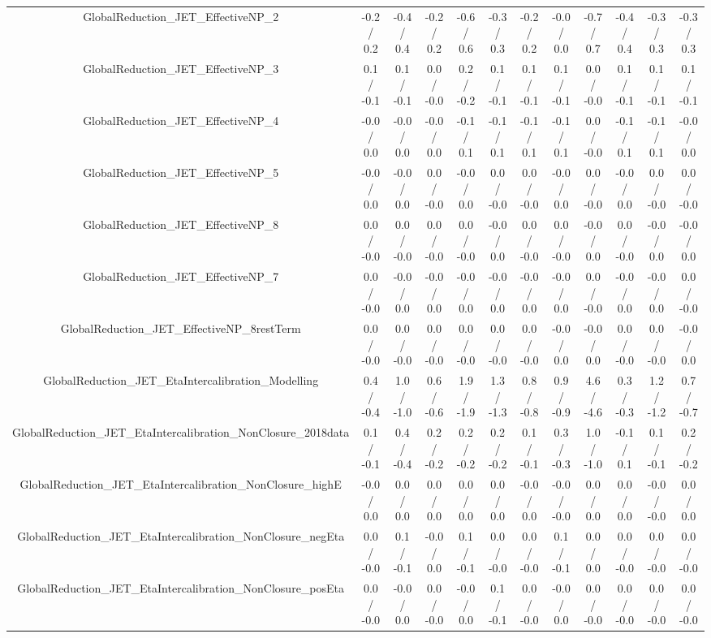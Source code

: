 \begin{table}[htbp]
\begin{center}
\begin{tabular}{|c|c|c|c|c|c|c|c|c|c|c|c|}
  GlobalReduction_JET_EffectiveNP_2 & -0.2 / 0.2 & -0.4 / 0.4 & -0.2 / 0.2 & -0.6 / 0.6 & -0.3 / 0.3 & -0.2 / 0.2 & -0.0 / 0.0 & -0.7 / 0.7 & -0.4 / 0.4 & -0.3 / 0.3 & -0.3 / 0.3 \\ 
  GlobalReduction_JET_EffectiveNP_3 & 0.1 / -0.1 & 0.1 / -0.1 & 0.0 / -0.0 & 0.2 / -0.2 & 0.1 / -0.1 & 0.1 / -0.1 & 0.1 / -0.1 & 0.0 / -0.0 & 0.1 / -0.1 & 0.1 / -0.1 & 0.1 / -0.1 \\ 
  GlobalReduction_JET_EffectiveNP_4 & -0.0 / 0.0 & -0.0 / 0.0 & -0.0 / 0.0 & -0.1 / 0.1 & -0.1 / 0.1 & -0.1 / 0.1 & -0.1 / 0.1 & 0.0 / -0.0 & -0.1 / 0.1 & -0.1 / 0.1 & -0.0 / 0.0 \\ 
  GlobalReduction_JET_EffectiveNP_5 & -0.0 / 0.0 & -0.0 / 0.0 & 0.0 / -0.0 & -0.0 / 0.0 & 0.0 / -0.0 & 0.0 / -0.0 & -0.0 / 0.0 & 0.0 / -0.0 & -0.0 / 0.0 & 0.0 / -0.0 & 0.0 / -0.0 \\ 
  GlobalReduction_JET_EffectiveNP_8 & 0.0 / -0.0 & 0.0 / -0.0 & 0.0 / -0.0 & 0.0 / -0.0 & -0.0 / 0.0 & 0.0 / -0.0 & 0.0 / -0.0 & -0.0 / 0.0 & 0.0 / -0.0 & -0.0 / 0.0 & -0.0 / 0.0 \\ 
  GlobalReduction_JET_EffectiveNP_7 & 0.0 / -0.0 & -0.0 / 0.0 & -0.0 / 0.0 & -0.0 / 0.0 & -0.0 / 0.0 & -0.0 / 0.0 & -0.0 / 0.0 & 0.0 / -0.0 & -0.0 / 0.0 & -0.0 / 0.0 & 0.0 / -0.0 \\ 
  GlobalReduction_JET_EffectiveNP_8restTerm & 0.0 / -0.0 & 0.0 / -0.0 & 0.0 / -0.0 & 0.0 / -0.0 & 0.0 / -0.0 & 0.0 / -0.0 & -0.0 / 0.0 & -0.0 / 0.0 & 0.0 / -0.0 & 0.0 / -0.0 & -0.0 / 0.0 \\ 
  GlobalReduction_JET_EtaIntercalibration_Modelling & 0.4 / -0.4 & 1.0 / -1.0 & 0.6 / -0.6 & 1.9 / -1.9 & 1.3 / -1.3 & 0.8 / -0.8 & 0.9 / -0.9 & 4.6 / -4.6 & 0.3 / -0.3 & 1.2 / -1.2 & 0.7 / -0.7 \\ 
  GlobalReduction_JET_EtaIntercalibration_NonClosure_2018data & 0.1 / -0.1 & 0.4 / -0.4 & 0.2 / -0.2 & 0.2 / -0.2 & 0.2 / -0.2 & 0.1 / -0.1 & 0.3 / -0.3 & 1.0 / -1.0 & -0.1 / 0.1 & 0.1 / -0.1 & 0.2 / -0.2 \\ 
  GlobalReduction_JET_EtaIntercalibration_NonClosure_highE & -0.0 / 0.0 & 0.0 / 0.0 & 0.0 / 0.0 & 0.0 / 0.0 & 0.0 / 0.0 & -0.0 / 0.0 & -0.0 / -0.0 & 0.0 / 0.0 & 0.0 / 0.0 & -0.0 / -0.0 & 0.0 / 0.0 \\ 
  GlobalReduction_JET_EtaIntercalibration_NonClosure_negEta & 0.0 / -0.0 & 0.1 / -0.1 & -0.0 / 0.0 & 0.1 / -0.1 & 0.0 / -0.0 & 0.0 / -0.0 & 0.1 / -0.1 & 0.0 / 0.0 & 0.0 / -0.0 & 0.0 / -0.0 & 0.0 / -0.0 \\ 
  GlobalReduction_JET_EtaIntercalibration_NonClosure_posEta & 0.0 / -0.0 & -0.0 / 0.0 & 0.0 / -0.0 & -0.0 / 0.0 & 0.1 / -0.1 & 0.0 / -0.0 & -0.0 / 0.0 & 0.0 / -0.0 & 0.0 / -0.0 & 0.0 / -0.0 & 0.0 / -0.0 \\ 

\end{tabular}
\end{center}
\end{table}
